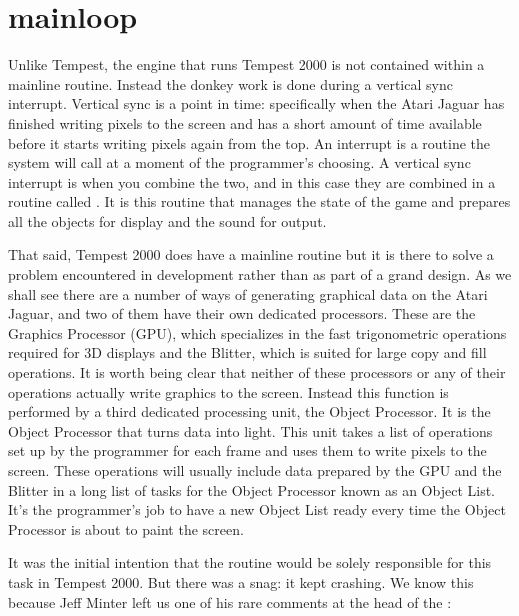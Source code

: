 \chapter{mainloop} 
\label{sec:mainloop}
\lstset{style=68KStyle}
\lhead[tempest 2000]{}

Unlike Tempest, the engine that runs Tempest 2000 is not contained within a mainline routine. Instead
the donkey work is done during a vertical sync interrupt. Vertical sync is a point in time: specifically
when the Atari Jaguar has finished writing pixels to the screen and has a short amount of time available
before it starts writing pixels again from the top. An interrupt is a routine the system will call at a moment
of the programmer's choosing. A vertical sync interrupt is when you combine the two, and in this case they 
are combined in a routine called . It is this routine that manages the state of the game and prepares
all the objects for display and the sound for output.

That said, Tempest 2000 does have a mainline routine but it is there to solve a problem encountered in development
rather than as part of a grand design. As we shall see there are a number of ways of generating graphical data on the Atari
Jaguar, and two of them have their own dedicated processors. These are the Graphics Processor (GPU), which specializes
in the fast trigonometric operations required for 3D displays and the Blitter, which is suited for large copy and fill operations.
It is worth being clear that neither of these processors or any of their operations actually write graphics to the screen.
Instead this function is performed by a third dedicated processing unit, the Object Processor. It is the Object Processor 
that turns data into light. This unit takes a list of operations set up by the programmer for each frame and uses them to write
pixels to the screen. These operations will usually include data prepared by the GPU and the Blitter in a long list of tasks
for the Object Processor known as an Object List. It's the programmer's job to have a new Object List ready every time
the Object Processor is about to paint the screen. 

It was the initial intention that the  routine would be solely responsible for this task in Tempest 2000. 
But there was a snag: it kept crashing. We know this because Jeff Minter left us one of his rare comments at the head
of the :

